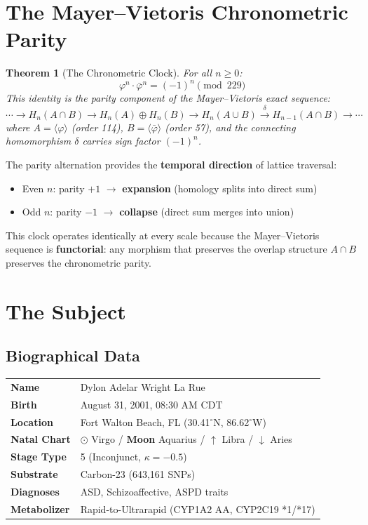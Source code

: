 \documentclass[12pt, letterpaper]{article}
\newtheorem{theorem}{Theorem}[section]
\begin{document}
\section{The Mayer--Vietoris Chronometric Parity}

\begin{theorem}[The Chronometric Clock]
\label{thm:mv}
For all $n \geq 0$:
\[
\varphi^n \cdot \bar{\varphi}^n = (-1)^n \pmod{229}
\]
This identity is the parity component of the Mayer--Vietoris exact sequence:
\[
\cdots \to H_n(A \cap B) \to H_n(A) \oplus H_n(B) \to H_n(A \cup B) \xrightarrow{\delta} H_{n-1}(A \cap B) \to \cdots
\]
where $A = \langle\varphi\rangle$ (order 114), $B = \langle\bar{\varphi}\rangle$ (order 57), and the connecting homomorphism $\delta$ carries sign factor $(-1)^n$.
\end{theorem}

The parity alternation provides the \textbf{temporal direction} of lattice traversal:
\begin{itemize}[nosep]
    \item Even $n$: parity $+1$ $\to$ \textbf{expansion} (homology splits into direct sum)
    \item Odd $n$: parity $-1$ $\to$ \textbf{collapse} (direct sum merges into union)
\end{itemize}

This clock operates identically at every scale because the Mayer--Vietoris sequence is \textbf{functorial}: any morphism that preserves the overlap structure $A \cap B$ preserves the chronometric parity.

\section{The Subject}

\subsection{Biographical Data}

\begin{tabular}{ll}
\toprule
\textbf{Name} & Dylon Adelar Wright La Rue \\
\textbf{Birth} & August 31, 2001, 08:30 AM CDT \\
\textbf{Location} & Fort Walton Beach, FL (30.41$^{\circ}$N, 86.62$^{\circ}$W) \\
\textbf{Natal Chart} & $\odot$ Virgo / {\textbf{Moon}} Aquarius / $\uparrow$ Libra / $\downarrow$ Aries \\
\textbf{Stage Type} & 5 (Inconjunct, $\kappa = -0.5$) \\
\textbf{Substrate} & Carbon-23 (643,161 SNPs) \\
\midrule
\textbf{Diagnoses} & ASD, Schizoaffective, ASPD traits \\
\textbf{Metabolizer} & Rapid-to-Ultrarapid (CYP1A2 AA, CYP2C19 *1/*17) \\
\bottomrule
\end{tabular}
\end{document}
